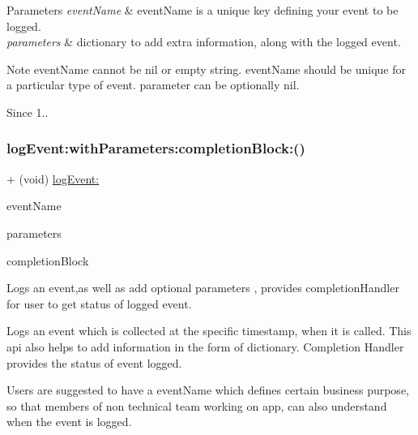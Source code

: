 \begin{DoxyParams}{Parameters}
{\em event\+Name} & event\+Name is a unique key defining your event to be logged. \\
\hline
{\em parameters} & dictionary to add extra information, along with the logged event.\\
\hline
\end{DoxyParams}
\begin{DoxyNote}{Note}
event\+Name cannot be nil or empty string. event\+Name should be unique for a particular type of event. parameter can be optionally nil. 
\end{DoxyNote}
\begin{DoxySince}{Since}
1.. 
\end{DoxySince}
\mbox{\label{interface_n_f_logger_a92e20244e4fd66dca9596a9e758cc6a1}} 
\subsubsection{\texorpdfstring{log\+Event\+:with\+Parameters\+:completion\+Block\+:()}{logEvent:withParameters:completionBlock:()}}
{\footnotesize\ttfamily + (void) \hyperlink{interface_n_f_logger_a932bba0925a8ffefec035de7f3cff73a}{log\+Event\+:} \begin{DoxyParamCaption}\item[{(N\+S\+String $\ast$)}]{event\+Name }\item[{withParameters:(N\+S\+Dictionary $\ast$)}]{parameters }\item[{completionBlock:(void($^\wedge$)(N\+F\+L\+O\+G\+Record\+Status record\+Status))}]{completion\+Block }\end{DoxyParamCaption}}



Logs an event,as well as add optional parameters , provides completion\+Handler for user to get status of logged event. 

Logs an event which is collected at the specific timestamp, when it is called. This api also helps to add information in the form of dictionary. Completion Handler provides the status of event logged.

Users are suggested to have a event\+Name which defines certain business purpose, so that members of non technical team working on app, can also understand when the event is logged.

